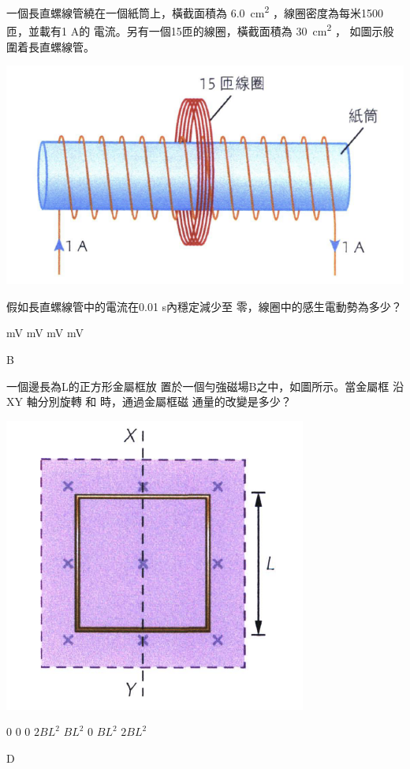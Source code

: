 {
    一個長直螺線管繞在一個紙筒上，橫截面積為  \qty{6.0}{cm^2} ，線圈密度為每米1500匝，並載有1 A的 電流。另有一個15匝的線圈，橫截面積為  \qty{30}{cm^2} ， 如圖示般圍着長直螺線管。
    \par{\par\centering\includegraphics[width=.35\textwidth]{./img/ch5_induction_mc_2024-06-24-16-56-43.png}\par}
    假如長直螺線管中的電流在0.01 s內穩定減少至 零，線圈中的感生電動勢為多少？
    \begin{tasks}
         mV
         mV
         mV
         mV
    \end{tasks}
}{B}

{
    一個邊長為L的正方形金屬框放 置於一個勻強磁場B之中，如圖所示。當金屬框 沿XY 軸分別旋轉  和  時，通過金屬框磁 通量的改變是多少？
    \par{\par\centering\includegraphics[width=.25\textwidth]{./img/ch5_induction_mc_2024-06-24-16-58-27.png}\par}
    \begin{tasks}
        \task []  \tab\tab {}
        \task $0$ \tab\tab $0$
        \task $0$ \tab\tab $2BL^2$
        \task $BL^2$ \tab\tab $0$
        \task $BL^2$ \tab\tab $2BL^2$
    \end{tasks}
}{D}

